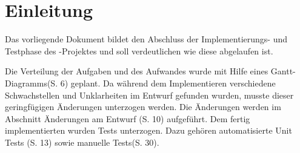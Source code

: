 \chapter{Einleitung}
Das vorliegende Dokument bildet den Abschluss der Implementierungs- und Testphase des \projektTitel-Projektes und soll verdeutlichen wie diese abgelaufen ist.

Die Verteilung der Aufgaben und des Aufwandes wurde mit Hilfe eines Gantt-Diagramms(S. 6) geplant.
Da während dem Implementieren verschiedene Schwachstellen und Unklarheiten im Entwurf gefunden wurden, musste dieser geringfügigen Änderungen unterzogen werden.
Die Änderungen werden im Abschnitt Änderungen am Entwurf (S. 10) aufgeführt.
Dem fertig implementierten \projektTitel wurden Tests unterzogen. Dazu gehören automatisierte Unit Tests (S. 13) sowie manuelle Tests(S. 30).